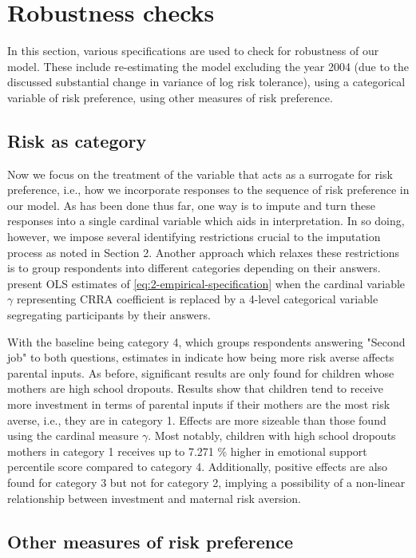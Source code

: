 \documentclass[]{article}
\begin{document}
\section{Robustness checks}
In this section, various specifications are used to check for robustness of our model. These include re-estimating the model excluding the year 2004 (due to the discussed substantial change in variance of log risk tolerance), using a categorical variable of risk preference, using other measures of risk preference.




\subsection{Risk as category}
Now we focus on the treatment of the variable that acts as a surrogate for risk preference, i.e., how we incorporate responses to the sequence of risk preference in our model. As has been done thus far, one way is to impute and turn these responses into a single cardinal variable which aids in interpretation. In so doing, however, we impose several identifying restrictions crucial to the imputation process as noted in Section 2. Another approach which relaxes these restrictions is to group respondents into different categories depending on their answers.  present OLS estimates of \eqref{eq:2-empirical-specification} when the cardinal variable $\gamma$ representing CRRA coefficient is replaced by a 4-level categorical variable segregating participants by their answers.



With the baseline being category 4, which groups respondents answering "Second job" to both questions, estimates in  indicate how being more risk averse affects parental inputs. As before, significant results are only found for children whose mothers are high school dropouts. Results show that children tend to receive more investment in terms of parental inputs if their mothers are the most risk averse, i.e., they are in category 1. Effects are more sizeable than those found using the cardinal measure $\gamma$. Most notably, children with high school dropouts mothers in category 1 receives up to 7.271 \% higher in emotional support percentile score compared to category 4. Additionally, positive effects are also found for category 3 but not for category 2, implying a possibility of a non-linear relationship between investment and maternal risk aversion.


\subsection{Other measures of risk preference}
\end{document}

